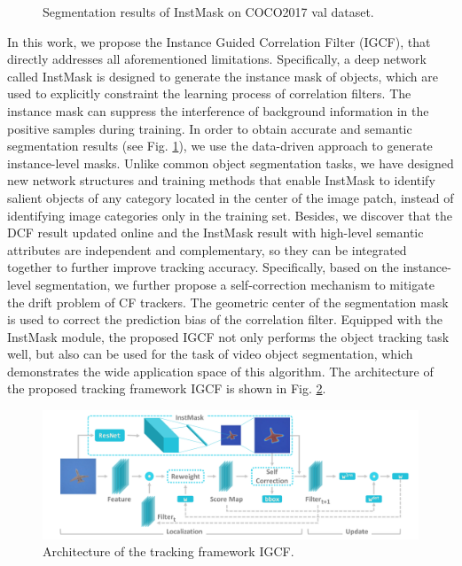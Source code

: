 \documentclass[review]{elsarticle}
\begin{document}
\begin{figure}
    \caption{Segmentation results of InstMask on COCO2017 \cite{Lin2014MicrosoftCC} val dataset.}
    \label{fig:InstMask}
\end{figure}

In this work, we propose the Instance Guided Correlation Filter (IGCF), that directly addresses all aforementioned limitations. Specifically, a deep network called InstMask is designed to generate the instance mask of objects, which are used to explicitly constraint the learning process of correlation filters. The instance mask can suppress the interference of background information in the positive samples during training. In order to obtain accurate and semantic segmentation results (see Fig. \ref{fig:InstMask}), we use the data-driven approach to generate instance-level masks. Unlike common object segmentation tasks, we have designed new network structures and training methods that enable InstMask to identify salient objects of any category located in the center of the image patch, instead of identifying image categories only in the training set. Besides, we discover that the DCF result updated online and the InstMask result with high-level semantic attributes are independent and complementary, so they can be integrated together to further improve tracking accuracy. Specifically, based on the instance-level segmentation, we further propose a self-correction mechanism to mitigate the drift problem of CF trackers. The geometric center of the segmentation mask is used to correct the prediction bias of the correlation filter. Equipped with the InstMask module, the proposed IGCF not only performs the object tracking task well, but also can be used for the task of video object segmentation, which demonstrates the wide application space of this algorithm. The architecture of the proposed tracking framework IGCF is shown in Fig. \ref{fig:IGCF}.

\begin{figure}
    \centering
    \includegraphics[width=12cm]{images/instmask.pdf}
    \caption{Architecture of the tracking framework IGCF.}
    \label{fig:IGCF}
\end{figure}
\end{document}
